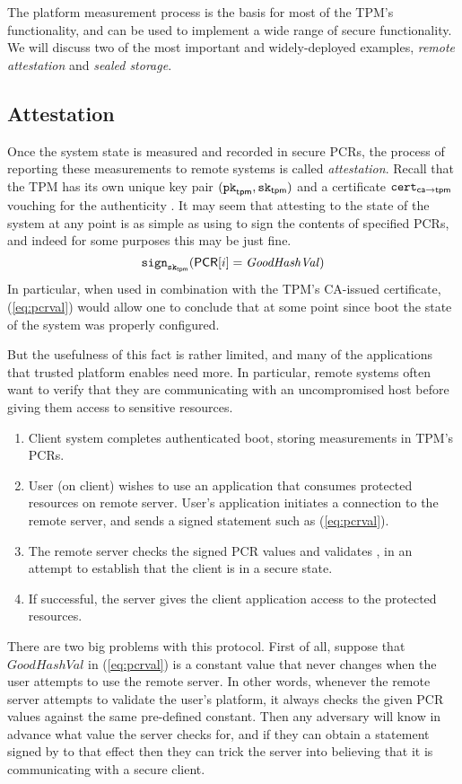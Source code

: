 \documentclass[11pt,twoside]{scrartcl}
\begin{document}
The platform measurement process is the basis for most of the TPM's functionality, and can be used to implement a wide range of secure functionality. We will discuss two of the most important and widely-deployed examples, \emph{remote attestation} and \emph{sealed storage}.

\subsection{Attestation}

Once the system state is measured and recorded in secure PCRs, the process of reporting these measurements to remote systems is called \emph{attestation}. Recall that the TPM has its own unique key pair $(\texttt{\upshape pk}_{\mathsf{tpm}},\texttt{\upshape sk}_{\mathsf{tpm}})$ and a certificate $\texttt{\upshape cert}_{\mathsf{ca} \to \mathsf{tpm}}$ vouching for the authenticity \pktpm. It may seem that attesting to the state of the system at any point is as simple as using \sktpm to sign the contents of specified PCRs, and indeed for some purposes this may be just fine. 
\begin{equation}
\label{eq:pcrval}
\sign{\sktpm}{\pcr[i] = \mathit{GoodHashVal}}
\end{equation}
In particular, when used in combination with the TPM's CA-issued certificate, (\ref{eq:pcrval}) would allow one to conclude that at some point since boot the state of the system was properly configured.

But the usefulness of this fact is rather limited, and many of the applications that trusted platform enables need more. In particular, remote systems often want to verify that they are communicating with an uncompromised host before giving them access to sensitive resources.
\begin{enumerate}
\item Client system completes authenticated boot, storing measurements in TPM's PCRs.
\item User (on client) wishes  to use an application that consumes protected resources on remote server. User's application initiates a connection to the remote server, and sends a signed statement such as (\ref{eq:pcrval}).
\item The remote server checks the signed PCR values and validates \pktpm, in an attempt to establish that the client is in a secure state.
\item If successful, the server gives the client application access to the protected resources.
\end{enumerate}
There are two big problems with this protocol. First of all, suppose that $\mathit{GoodHashVal}$ in (\ref{eq:pcrval}) is a constant value that never changes when the user attempts to use the remote server. In other words, whenever the remote server attempts to validate the user's platform, it always checks the given PCR values against the same pre-defined constant. Then any adversary will know in advance what value the server checks for, and if they can obtain a statement signed by \tpm to that effect then they can trick the server into believing that it is communicating with a secure client.
\end{document}
